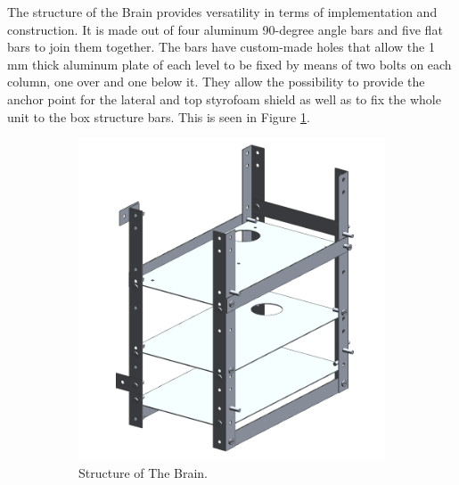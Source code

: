 \documentclass[a4paper,12pt,twoside]{article}
\providecommand{\DIFaddtex}[1]{{\protect\color{blue}\uwave{#1}}} %
\providecommand{\DIFaddFL}[1]{\DIFadd{#1}} %
\providecommand{\DIFaddbeginFL}{} %
\providecommand{\DIFaddendFL}{} %
\providecommand{\DIFdelbeginFL}{} %
\providecommand{\DIFdelendFL}{} %
\providecommand{\DIFadd}[1]{\texorpdfstring{\DIFaddtex{#1}}{#1}} %
\newcommand{\DIFscaledelfig}{0.5}
\newlength{\DIFdelgraphicswidth} %
\newlength{\DIFdelgraphicsheight} %
\newcommand{\DIFaddincludegraphics}[2][]{{\color{blue}\fbox{\DIFOincludegraphics[#1]{#2}}}} %
\newcommand{\DIFdelincludegraphics}[2][]{%
\sbox{\DIFdelgraphicsbox}{\DIFOincludegraphics[#1]{#2}}%
\settoboxwidth{\DIFdelgraphicswidth}{\DIFdelgraphicsbox} %
\settoboxtotalheight{\DIFdelgraphicsheight}{\DIFdelgraphicsbox} %
\scalebox{\DIFscaledelfig}{%
\parbox[b]{\DIFdelgraphicswidth}{\usebox{\DIFdelgraphicsbox}\\[-\baselineskip] \rule{\DIFdelgraphicswidth}{0em}}\llap{\resizebox{\DIFdelgraphicswidth}{\DIFdelgraphicsheight}{%
\setlength{\unitlength}{\DIFdelgraphicswidth}%
\begin{picture}(1,1)%
\thicklines\linethickness{2pt} %
{\color[rgb]{1,0,0}\put(0,0){\framebox(1,1){}}}%
{\color[rgb]{1,0,0}\put(0,0){\line( 1,1){1}}}%
{\color[rgb]{1,0,0}\put(0,1){\line(1,-1){1}}}%
\end{picture}%
}\hspace*{3pt}}} %
} %
\DeclareRobustCommand{\DIFaddbeginFL}{\DIFOaddbeginFL \let\includegraphics\DIFaddincludegraphics} %
\DeclareRobustCommand{\DIFaddendFL}{\DIFOaddendFL \let\includegraphics\DIFOincludegraphics} %
\DeclareRobustCommand{\DIFdelbeginFL}{\DIFOdelbeginFL \let\includegraphics\DIFdelincludegraphics} %
\DeclareRobustCommand{\DIFdelendFL}{\DIFOaddendFL \let\includegraphics\DIFOincludegraphics} %
\begin{document}
\smallskip
The structure of the Brain provides versatility in terms of implementation and construction. It is made out of four aluminum 90-degree angle bars and five flat bars to join them together. The bars have custom-made holes that allow the 1 mm thick aluminum plate of each level to be fixed by means of two bolts on each column, one over and one below it. They allow the possibility to provide the anchor point for the lateral and top styrofoam shield as well as to fix the whole unit to the box structure bars. This is seen in Figure \ref{brain_structure}. 

\begin{figure}[H]
    \centering
    \DIFdelbeginFL %
\DIFdelendFL \DIFaddbeginFL \begin{subfigure}[b]{0.48\textwidth}
    \centering
    \includegraphics[width=\textwidth]{4-experiment-design/img/Mechanical/Brain_Structure.png}
    \DIFaddendFL \caption{Structure of The Brain.}
    \label{brain_structure}
    \DIFaddbeginFL \end{subfigure}
    \DIFaddFL{~
    }\begin{subfigure}[b]{0.48\textwidth}
    \centering

\end{subfigure}
\end{figure}
\end{document}
